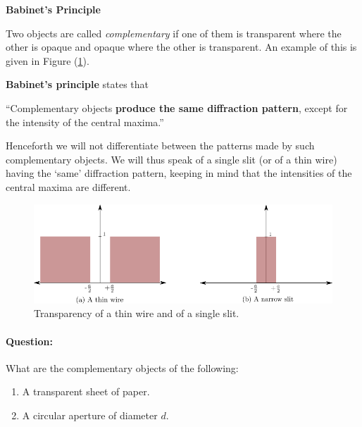 \begin{imp}

\begin{center}
    \textbf{Babinet's Principle}
\end{center}

Two objects are called \textit{complementary} if one of them is transparent where the other is opaque and opaque where the other is transparent. An example of this is given in Figure (\ref{fig:complementary}).

\textbf{Babinet's principle} states that

\begin{center}
``Complementary objects \textbf{produce the same diffraction pattern}, except for the intensity of the central maxima.''
\end{center}


Henceforth we will not differentiate between the patterns made by such complementary objects. We will thus speak of a single slit (or of a thin wire) having the `same' diffraction pattern, keeping in mind that the intensities of the central maxima are different.
\end{imp}

\begin{figure}[!htb]
    \centering
    \includegraphics[scale=0.6]{figs/complementary.png}
    \caption{Transparency of a thin wire and of a single slit.}
    \label{fig:complementary}
\end{figure}

\begin{question}
\paragraph{Question:} What are the complementary objects of the following:

\begin{enumerate}
\item A transparent sheet of paper.
\item A circular aperture of diameter $d$.
\end{enumerate}
\end{question}



